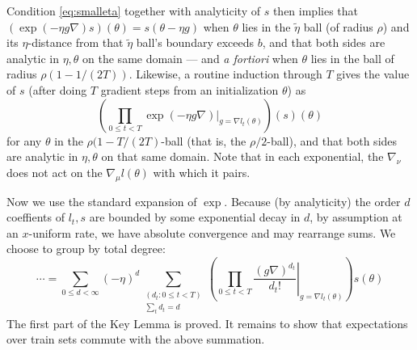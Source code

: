 \documentclass{article}
\newcommand{\wrap}[1]{\left(#1\right)}
\begin{document}
            Condition \ref{eq:smalleta} together with analyticity of $s$ then
            implies that
            $
                \wrap{\exp(-\eta g \nabla) s}(\theta) = s(\theta - \eta g)
            $
            when $\theta$ lies in the $\tilde\eta$ ball (of radius $\rho$) and
            its $\eta$-distance from that $\tilde\eta$ ball's boundary exceeds
            $b$, and that both sides are analytic in $\eta, \theta$ on the 
            same domain --- and \emph{a fortiori} when $\theta$ lies in the
            ball of radius $\rho (1 - 1/(2T))$.
            Likewise, a routine induction through $T$ gives the value of $s$
            (after doing $T$ gradient steps from an initialization $\theta$) as
            $$
                \wrap{
                    \prod_{0\leq t<T}
                        \left.
                            \exp(-\eta g \nabla)
                        \right|_{g=\nabla l_t(\theta)}
                }
                (s)(\theta)
            $$
            for any $\theta$ in the $\rho (1-T/(2T)$-ball (that is, the
            $\rho/2$-ball), and that both sides are analytic in $\eta, \theta$
            on that same domain.  Note that in each exponential, the
            $\nabla_\nu$ does not act on the $\nabla_\mu l(\theta)$ with which
            it pairs.  

            Now we use the standard expansion of $\exp$.  Because (by
            analyticity) the order $d$ coeffients of $l_t, s$ are bounded by some
            exponential decay in $d$, by assumption at an $x$-uniform rate, we
            have absolute convergence and may rearrange sums.  We choose to
            group by total degree:
            \begin{equation} \label{eq:expansion}
                \cdots 
                =
                \sum_{0\leq d < \infty} (-\eta)^d
                \sum_{\substack{(d_t: 0\leq t<T) \\ \sum_t d_t = d}}
                \wrap{
                    \prod_{0 \leq t < T} \left.
                        \frac{(g \nabla)^{d_t}}{d_t!}
                    \right|_{g=\nabla l_t(\theta)}
                } s (\theta)
            \end{equation}
            The first part of the Key Lemma is proved.  It remains to show that
            expectations over train sets commute with the above summation.
\end{document}
